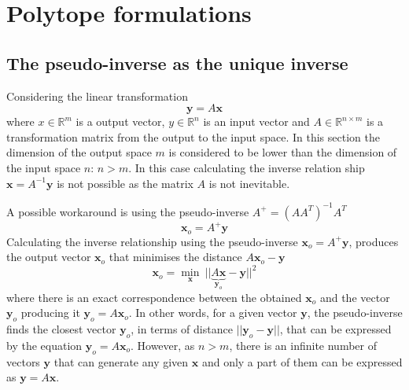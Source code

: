 \chapter{Polytope formulations}

\section{The pseudo-inverse as the unique inverse} 
\label{ch:pseudoinverse_unique}



Considering the linear transformation 
\begin{equation}
    \bm{y} = A\bm{x}
\end{equation}
where $x\in\mathbb{R}^m$ is a output vector,  $y\in\mathbb{R}^n$ is an input vector and $A\in\mathbb{R}^{n\times m}$ is a transformation matrix from the output to the input space. In this section the dimension of the output space $m$ is considered to be lower than the dimension of the input space $n$: $n>m$. In this case calculating the inverse relation ship $\bm{x}=A^{-1}\bm{y}$ is not possible as the matrix $A$ is not inevitable. 

A possible workaround is using the pseudo-inverse $A^+=(AA^T)^{-1}A^T$ 
$$\bm{x}_o=A^+\bm{y}$$
Calculating the inverse relationship using the pseudo-inverse $\bm{x}_o = A^+\bm{y}$, produces the output vector $\bm{x}_o$ that minimises the distance $A\bm{x}_o-\bm{y}$
\begin{equation}
    \bm{x}_o = \min_{\bm{x}} ~|| \underbrace{A\bm{x}}_{\bm{y}_o} - \bm{y}||^2 
    \label{eq:pseudoinverse_opt}
\end{equation}
where there is an exact correspondence between the obtained $\bm{x}_o$ and the vector $\bm{y}_o$ producing it $\bm{y}_o=A\bm{x}_o$.
In other words, for a given vector $\bm{y}$, the pseudo-inverse finds the closest vector $\bm{y}_o$, in terms of distance $||\bm{y}_o-\bm{y}||$, that can be expressed by the equation $\bm{y}_o=A\bm{x}_o$. However, as $n>m$, there is an infinite number of vectors $\bm{y}$ that can generate any given $\bm{x}$ and only a part of them can be expressed as $\bm{y}=A\bm{x}$.

